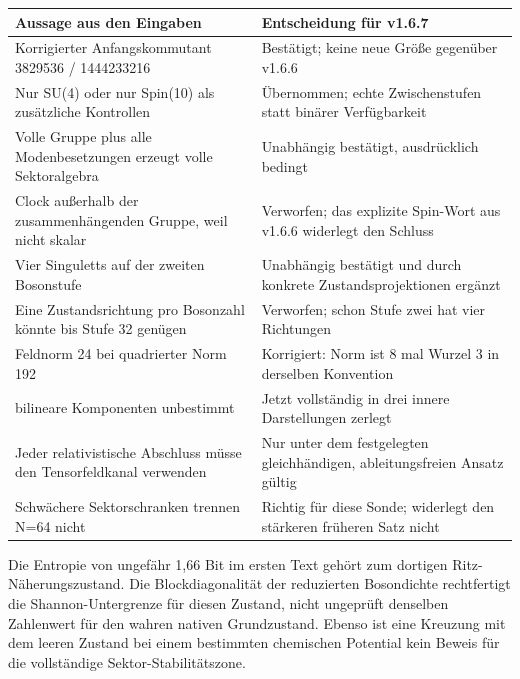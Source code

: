 {\def\LTcaptype{none} %
\begin{longtable}[]{@{}
  >{\raggedright\arraybackslash}p{}
  >{\raggedright\arraybackslash}p{}@{}}
\toprule\noalign{}
\begin{minipage}[b]{\linewidth}\raggedright
Aussage aus den Eingaben
\end{minipage} & \begin{minipage}[b]{\linewidth}\raggedright
Entscheidung für v1.6.7
\end{minipage} \\
\midrule\noalign{}
\endhead
\bottomrule\noalign{}
\endlastfoot
Korrigierter Anfangskommutant 3829536 / 1444233216 & Bestätigt; keine
neue Größe gegenüber v1.6.6 \\
Nur SU(4) oder nur Spin(10) als zusätzliche Kontrollen & Übernommen;
echte Zwischenstufen statt binärer Verfügbarkeit \\
Volle Gruppe plus alle Modenbesetzungen erzeugt volle Sektoralgebra &
Unabhängig bestätigt, ausdrücklich bedingt \\
Clock außerhalb der zusammenhängenden Gruppe, weil nicht skalar &
Verworfen; das explizite Spin-Wort aus v1.6.6 widerlegt den Schluss \\
Vier Singuletts auf der zweiten Bosonstufe & Unabhängig bestätigt und
durch konkrete Zustandsprojektionen ergänzt \\
Eine Zustandsrichtung pro Bosonzahl könnte bis Stufe 32 genügen &
Verworfen; schon Stufe zwei hat vier Richtungen \\
Feldnorm 24 bei quadrierter Norm 192 & Korrigiert: Norm ist 8 mal Wurzel
3 in derselben Konvention \\
4035 bilineare Komponenten unbestimmt & Jetzt vollständig in drei innere
Darstellungen zerlegt \\
Jeder relativistische Abschluss müsse den Tensorfeldkanal verwenden &
Nur unter dem festgelegten gleichhändigen, ableitungsfreien Ansatz
gültig \\
Schwächere Sektorschranken trennen N=64 nicht & Richtig für diese Sonde;
widerlegt den stärkeren früheren Satz nicht \\
\end{longtable}
}

Die Entropie von ungefähr 1,66 Bit im ersten Text gehört zum dortigen
Ritz-Näherungszustand. Die Blockdiagonalität der reduzierten Bosondichte
rechtfertigt die Shannon-Untergrenze für diesen Zustand, nicht ungeprüft
denselben Zahlenwert für den wahren nativen Grundzustand. Ebenso ist
eine Kreuzung mit dem leeren Zustand bei einem bestimmten chemischen
Potential kein Beweis für die vollständige Sektor-Stabilitätszone.

